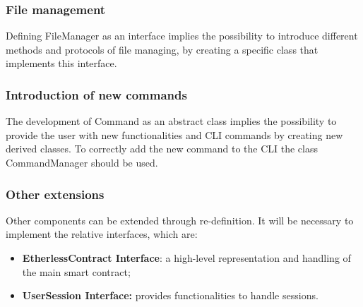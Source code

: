 \subsubsection{File management}
Defining FileManager as an interface implies the possibility to introduce different methods and protocols of file managing, by creating a specific class that implements this interface. 

\subsubsection{Introduction of new commands}
The development of Command as an abstract class implies the possibility to provide the user with new functionalities and CLI commands by creating new derived classes. To correctly add the new command to the CLI the class CommandManager should be used.

\subsubsection{Other extensions}
Other components can be extended through re-definition. It will be necessary to implement the relative interfaces, which are:
\begin{itemize}
	\item \textbf{EtherlessContract Interface}: a high-level representation and handling of the main smart contract;
	\item \textbf{UserSession Interface:} provides functionalities to handle sessions.
\end{itemize}